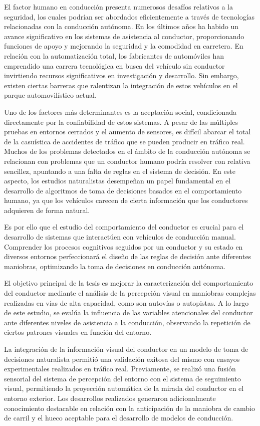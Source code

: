 El factor humano en conducción presenta numerosos desafíos relativos a la seguridad, los cuales podrían ser abordados eficientemente a través de tecnologías relacionadas con la conducción autónoma. En los últimos años ha habido un avance significativo en los sistemas de asistencia al conductor, proporcionando funciones de apoyo y mejorando la seguridad y la comodidad en carretera. En relación con la automatización total, los fabricantes de automóviles han emprendido una carrera tecnológica en busca del vehículo sin conductor invirtiendo recursos significativos en investigación y desarrollo. Sin embargo, existen ciertas barreras que ralentizan la integración de estos vehículos en el parque automovilístico actual. 

Uno de los factores más determinantes es la aceptación social, condicionada directamente por la confiabilidad de estos sistemas. A pesar de las múltiples pruebas en entornos cerrados y el aumento de sensores, es difícil abarcar el total de la casuística de accidentes de tráfico que se pueden producir en tráfico real. Muchos de los problemas detectados en el ámbito de la conducción autónoma se relacionan con problemas que un conductor humano podría resolver con relativa sencillez, apuntando a una falta de reglas en el sistema de decisión. En este aspecto, los estudios naturalistas desempeñan un papel fundamental en el desarrollo de algoritmos de toma de decisiones basados en el comportamiento humano, ya que los vehículos carecen de cierta información que los conductores adquieren de forma natural.

Es por ello que el estudio del comportamiento del conductor es crucial para el desarrollo de sistemas que interactúen con vehículos de conducción manual. Comprender los procesos cognitivos seguidos por un conductor y su estado en diversos entornos perfeccionará el diseño de las reglas de decisión ante diferentes maniobras, optimizando la toma de decisiones en conducción autónoma.

El objetivo principal de la tesis es mejorar la caracterización del comportamiento del conductor mediante el análisis de la percepción visual en maniobras complejas realizadas en vías de alta capacidad, como son autovías o autopistas. A lo largo de este estudio, se evalúa la influencia de las variables atencionales del conductor ante diferentes niveles de asistencia a la conducción, observando la repetición de ciertos patrones visuales en función del entorno. 

La integración de la información visual del conductor en un modelo de toma de decisiones naturalista permitió una validación exitosa del mismo con ensayos experimentales realizados en tráfico real. Previamente, se realizó una fusión sensorial del sistema de percepción del entorno con el sistema de seguimiento visual, permitiendo la proyección automática de la mirada del conductor en el entorno exterior. Los desarrollos realizados generaron adicionalmente conocimiento destacable en relación con la anticipación de la maniobra de cambio de carril y el hueco aceptable para el desarrollo de modelos de conducción. 

